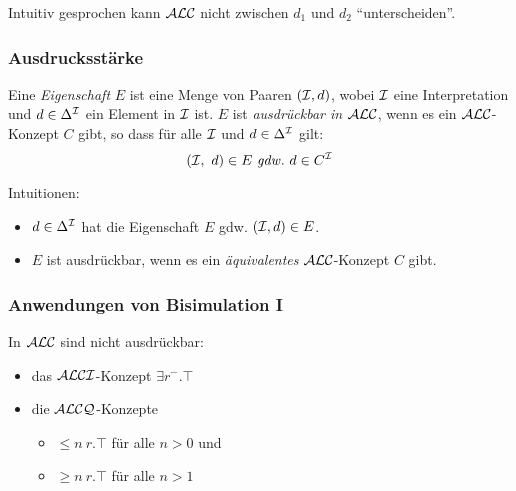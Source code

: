 Intuitiv gesprochen kann $\mathcal{A}\mathcal{L}\mathcal{C}$ nicht zwischen $d_1$ und $d_2$ \enquote{unterscheiden}.

\subsubsection{Ausdrucksstärke}\label{ausdrucksstuxe4rke}

\begin{definition}

Eine \emph{Eigenschaft} $E$ ist eine Menge von Paaren $(\mathcal{I},d)$, wobei
$\mathcal{I}$ eine Interpretation und $d \in \Delta^{\mathcal{I}}$ ein Element in $\mathcal{I}$ ist.
$E$ ist \emph{ausdrückbar in $\mathcal{A}\mathcal{L}\mathcal{C}$}, wenn es ein $\mathcal{A}\mathcal{L}\mathcal{C}$-Konzept $C$
gibt, so dass für alle $\mathcal{I}$ und $d \in \Delta^{\mathcal{I}}$ gilt: 
\[ \left( \MI,\ d \right) \in E \gdw d \in C^\MI \]
\end{definition}

Intuitionen:
\begin{itemize}
    \item $d \in \Delta^{\mathcal{I}}$ hat die Eigenschaft $E$ gdw. $(\mathcal{I}, d) \in E$.
    \item $E$ ist ausdrückbar, wenn es ein \emph{äquivalentes} $\mathcal{A}\mathcal{L}\mathcal{C}$-Konzept $C$ gibt.
\end{itemize}

\subsubsection{Anwendungen von Bisimulation I}\label{theorem-3.4}

\begin{theorem}
    \label{thm:beschraenkt}
In $\mathcal{A}\mathcal{L}\mathcal{C}$ sind nicht ausdrückbar: 
\begin{itemize}
\item das $\mathcal{A}\mathcal{L}\mathcal{C}\mathcal{I}$-Konzept $\exists r^{-}.\top$ 
\item die $\mathcal{A}\mathcal{L}\mathcal{C}\mathcal{Q}$-Konzepte
\begin{itemize}
  \item $\leq n\ r.\top$ für alle $n > 0$ und
  \item $\geq n\ r.\top$ für alle $n > 1$
\end{itemize}
\end{itemize}
\end{theorem}


